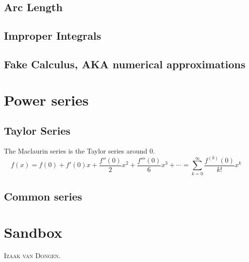 \documentclass[fleqn,a4paper,11pt]{article}
\begin{document}

    \subsection{Arc Length}

    \subsection{Improper Integrals}


    \subsection{Fake Calculus, AKA numerical approximations}

    \section{Power series} %

    \subsection{Taylor Series}

    The Maclaurin series is the Taylor series around \(0\).
    \begin{equation}
    f(x) = f(0) + f'(0) x + \frac{f''(0)} 2 x^2 + \frac{f'''(0)}{6}x^3 +\dotsb
      = \sum_{k=0}^\infty \frac{f^{(k)}(0)}{k!}x^k
    \end{equation}

    \subsection{Common series}

    \section{Sandbox}

    \lettrine{\color{RoyalBlue4}I}{zaak van Dongen}. \lipsum[1]
\end{document}
